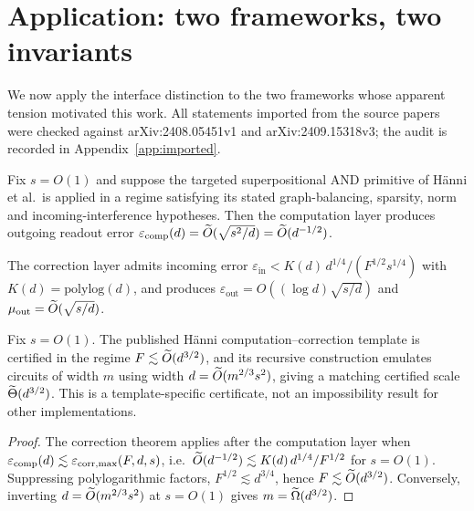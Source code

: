 \section{Application: two frameworks, two invariants}
\label{sec:application}

We now apply the interface distinction to the two frameworks whose apparent tension motivated
this work. All statements imported from the source papers were checked against
arXiv:2408.05451v1 and arXiv:2409.15318v3; the audit is recorded in
Appendix~\ref{app:imported}.

\begin{lemma}
\label{lem:comp}
Fix $s=O(1)$ and suppose the targeted superpositional AND primitive of H\"{a}nni et al.\ is
applied in a regime satisfying its stated graph-balancing, sparsity, norm and
incoming-interference hypotheses. Then the computation layer produces outgoing readout error
$\varepsilon_{\mathrm{comp}}(d)=\widetilde{O}(\sqrt{s^2/d})=\widetilde{O}(d^{-1/2})$.
\end{lemma}

\begin{lemma}
\label{lem:corr}
The correction layer admits incoming error
$\varepsilon_{\mathrm{in}}<K(d)\,d^{1/4}/(F^{1/2}s^{1/4})$ with $K(d)=\mathrm{polylog}(d)$, and
produces $\varepsilon_{\mathrm{out}}=O((\log d)\sqrt{s/d})$ and
$\mu_{\mathrm{out}}=\widetilde{O}(\sqrt{s/d})$.
\end{lemma}

\begin{proposition}
\label{prop:hanni}
Fix $s=O(1)$. The published H\"{a}nni computation--correction template is certified in the
regime $F\lesssim\widetilde{O}(d^{3/2})$, and its recursive construction emulates circuits of width
$m$ using width $d=\widetilde{O}(m^{2/3}s^2)$, giving a matching certified scale
$\widetilde{\Theta}(d^{3/2})$. This is a template-specific certificate, not an impossibility result
for other implementations.
\end{proposition}

\begin{proof}
The correction theorem applies after the computation layer when $\varepsilon_{\mathrm{comp}}(d)\lesssim
\varepsilon_{\mathrm{corr,max}}(F,d,s)$, i.e.\ $\widetilde{O}(d^{-1/2})\lesssim K(d)\,d^{1/4}/F^{1/2}$ for $s=O(1)$.
Suppressing polylogarithmic factors, $F^{1/2}\lesssim d^{3/4}$, hence
$F\lesssim\widetilde{O}(d^{3/2})$. Conversely, inverting $d=\widetilde{O}(m^{2/3}s^2)$ at $s=O(1)$ gives
$m=\widetilde{\Omega}(d^{3/2})$.
\end{proof}

